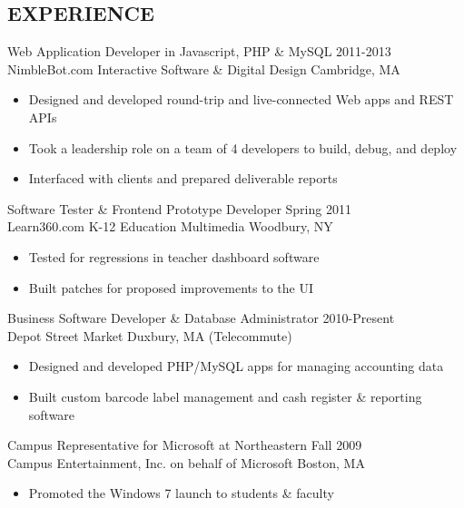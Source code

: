 \documentclass[line,margin]{res}
\begin{document}
\begin{resume}
\section{EXPERIENCE}
    {\large Web Application Developer in Javascript, PHP \& MySQL} \hfill 2011-2013 \\
    NimbleBot.com Interactive Software \& Digital Design 
    \hfill Cambridge, MA
     \begin{itemize}  \itemsep -2pt %
     \item Designed and developed round-trip and live-connected Web apps and REST APIs
     \item Took a leadership role on a team of 4 developers to build, debug, and deploy
     \item Interfaced with clients and prepared deliverable reports
    \end{itemize}

    {\large Software Tester \& Frontend Prototype Developer}
    \hfill Spring 2011 \\
    Learn360.com K-12 Education Multimedia \hfill Woodbury, NY
     \begin{itemize}  \itemsep -2pt %
     \item Tested for regressions in teacher dashboard software
     \item Built patches for proposed improvements to the UI
    \end{itemize}

    {\large Business Software Developer \& Database Administrator}
    \hfill 2010-Present \\
    Depot Street Market \hfill Duxbury, MA {\footnotesize (Telecommute)}
     \begin{itemize}  \itemsep -2pt %
     \item Designed and developed PHP/MySQL apps for managing accounting data
     \item Built custom barcode label management and cash register \& reporting software
    \end{itemize}

    {\large Campus Representative for Microsoft at Northeastern}
    \hfill Fall 2009 \\
    Campus Entertainment, Inc. on behalf of Microsoft \hfill Boston, MA
     \begin{itemize}  \itemsep -2pt %
     \item Promoted the Windows 7 launch to students \& faculty
    \end{itemize}


\end{resume}
\end{document}
